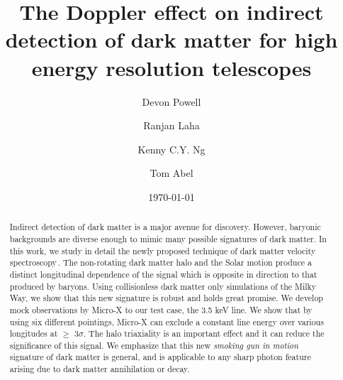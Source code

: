 \documentclass[aps,prd,10pt,twocolumn,superscriptaddress,showpacs,footinbib]{revtex4-1}
\begin{document}
\title{The Doppler effect on indirect detection of dark matter for high energy resolution telescopes}
\author{Devon Powell}
\author{Ranjan Laha}
\author{Kenny C.Y. Ng}
\author{Tom Abel}
\date{\today}

\begin{abstract}
Indirect detection of dark matter is a major avenue for discovery.  However, baryonic backgrounds
are diverse enough to mimic many possible signatures of dark matter.  In this work, we study in
detail the newly proposed technique of dark matter velocity spectroscopy\,\cite{speckhard2016}.
The non-rotating dark matter halo and the Solar motion produce a distinct longitudinal dependence of
the signal which is opposite in direction to that produced by baryons.  Using collisionless dark
matter only simulations of the Milky Way, we show that this new signature is robust and holds great
promise.  We develop mock observations by Micro-X to our test case, the 3.5 keV line.  We show that by using six different pointings, Micro-X can exclude a constant line energy over various longitudes at $\geq$ 3$\sigma$.  The halo triaxiality is an important effect and it can reduce the significance of this signal.  We emphasize that this new {\it smoking gun in motion} signature of dark matter is general, and is applicable to any sharp photon feature arising due to dark matter annihilation or decay.
\end{abstract}

\end{document}
